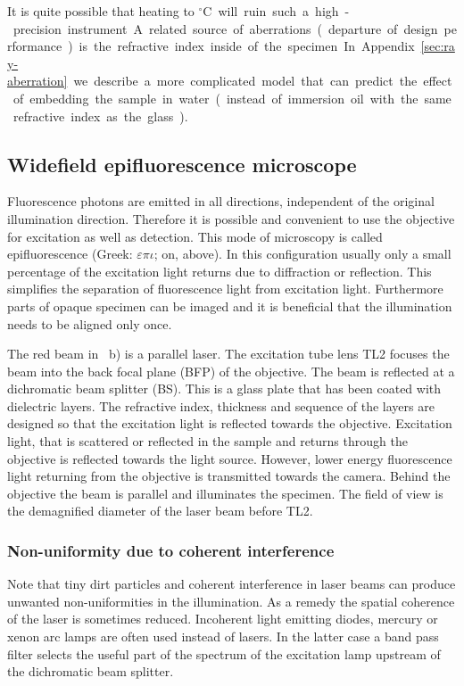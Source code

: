 It is quite possible that heating to \unit[37]{${}^\circ$C} will ruin
such a high-precision instrument. A related source of aberrations
(departure of design performance) is the refractive index inside of
the specimen. In Appendix~\ref{sec:ray-aberration} we describe a more
complicated model that can predict the effect of embedding the sample
in water (instead of immersion oil with the same refractive index as
the glass).

\subsection{Widefield epifluorescence microscope}
Fluorescence photons are emitted in all directions, independent of the
original illumination direction. Therefore it is possible and
convenient to use the objective for excitation as well as
detection. This mode of microscopy is called epifluorescence (Greek:
$\varepsilon\pi\iota$; on, above).  In this configuration usually only
a small percentage of the excitation light returns due to diffraction
or reflection. This simplifies the separation of fluorescence light
from excitation light.  Furthermore parts of opaque specimen can be
imaged and it is beneficial that the illumination needs to be aligned
only once.


The red beam in ~b) is a parallel
laser. The excitation tube lens TL2 focuses the beam into the back
focal plane (BFP) of the objective. The beam is reflected at a
dichromatic beam splitter (BS). This is a glass plate that has been
coated with dielectric layers. The refractive index, thickness and
sequence of the layers are designed so that the excitation light is
reflected towards the objective. Excitation light, that is scattered
or reflected in the sample and returns through the objective is
reflected towards the light source. However, lower energy fluorescence
light returning from the objective is transmitted towards the
camera. Behind the objective the beam is parallel and illuminates the
specimen. The field of view is the demagnified diameter of the laser
beam before TL2.
\subsubsection*{Non-uniformity due to coherent interference}
Note that tiny dirt particles and coherent interference in laser beams
can produce unwanted non-uniformities in the illumination. As a remedy
the spatial coherence of the laser is sometimes reduced.  Incoherent
light emitting diodes, mercury or xenon arc lamps are often used
instead of lasers. In the latter case a band pass filter selects the
useful part of the spectrum of the excitation lamp upstream of the
dichromatic beam splitter.

